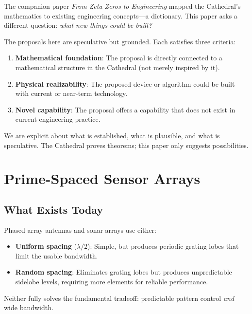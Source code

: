 \documentclass[11pt,a4paper]{article}
\begin{document}
The companion paper \emph{From Zeta Zeros to Engineering} mapped
the Cathedral's mathematics to existing engineering concepts---a
dictionary. This paper asks a different question: \emph{what new
things could be built?}

The proposals here are speculative but grounded. Each satisfies
three criteria:

\begin{enumerate}
  \item \textbf{Mathematical foundation}: The proposal is directly
    connected to a mathematical structure in the Cathedral (not
    merely inspired by it).
  \item \textbf{Physical realizability}: The proposed device or
    algorithm could be built with current or near-term technology.
  \item \textbf{Novel capability}: The proposal offers a capability
    that does not exist in current engineering practice.
\end{enumerate}

We are explicit about what is established, what is plausible, and
what is speculative. The Cathedral proves theorems; this paper only
suggests possibilities.

\section{Prime-Spaced Sensor Arrays}
\label{sec:arrays}

\subsection{What Exists Today}

Phased array antennas and sonar arrays use either:
\begin{itemize}
  \item \textbf{Uniform spacing} ($\lambda/2$): Simple, but produces
    periodic grating lobes that limit the usable bandwidth.
  \item \textbf{Random spacing}: Eliminates grating lobes but
    produces unpredictable sidelobe levels, requiring more elements
    for reliable performance.
\end{itemize}

Neither fully solves the fundamental tradeoff: predictable pattern
control \emph{and} wide bandwidth.
\end{document}

